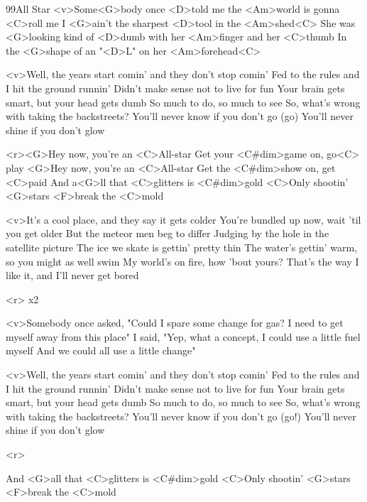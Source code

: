 \begin{song}{99}{All Star}{}
<v>Some<G>body once <D>told me the <Am>world is gonna <C>roll me
I <G>ain't the sharpest <D>tool in the <Am>shed<C>
She was <G>looking kind of <D>dumb with her <Am>finger and her <C>thumb
In the <G>shape of an "<D>L" on her <Am>forehead<C>

<v>Well, the years start comin' and they don't stop comin'
Fed to the rules and I hit the ground runnin'
Didn't make sense not to live for fun
Your brain gets smart, but your head gets dumb
So much to do, so much to see
So, what's wrong with taking the backstreets?
You'll never know if you don't go (go)
You'll never shine if you don't glow

<r><G>Hey now, you're an <C>All-star
Get your <C#dim>game on, go<C> play
<G>Hey now, you're an <C>All-star
Get the <C#dim>show on, get <C>paid
And a<G>ll that <C>glitters is <C#dim>gold
<C>Only shootin' <G>stars <F>break the <C>mold

<v>It's a cool place, and they say it gets colder
You're bundled up now, wait 'til you get older
But the meteor men beg to differ
Judging by the hole in the satellite picture
The ice we skate is gettin' pretty thin
The water's gettin' warm, so you might as well swim
My world's on fire, how 'bout yours?
That's the way I like it, and I'll never get bored

<r> x2

<v>Somebody once asked, "Could I spare some change for gas?
I need to get myself away from this place"
I said, "Yep, what a concept, I could use a little fuel myself
And we could all use a little change"

<v>Well, the years start comin' and they don't stop comin'
Fed to the rules and I hit the ground runnin'
Didn't make sense not to live for fun
Your brain gets smart, but your head gets dumb
So much to do, so much to see
So, what's wrong with taking the backstreets?
You'll never know if you don't go (go!)
You'll never shine if you don't glow

<r>

And <G>all that <C>glitters is <C#dim>gold
<C>Only shootin' <G>stars <F>break the <C>mold
\end{song}
